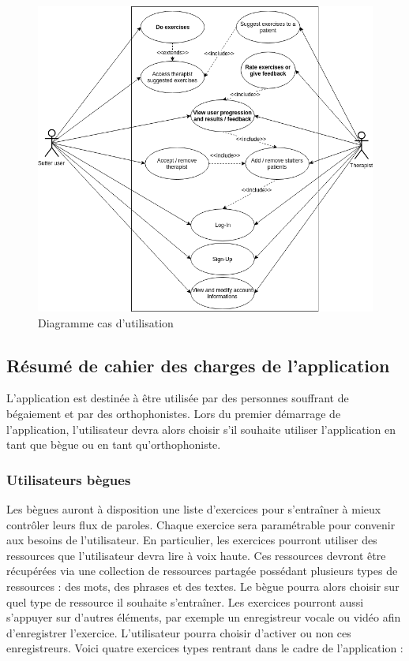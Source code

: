\begin{figure}[h]
  \includegraphics[width=.9\linewidth]{content/imgs/usecase.png}
  \caption{Diagramme cas d'utilisation}
  \label{fig:srs}
\end{figure}

\subsection{Résumé de cahier des charges de l'application}
\label{sec:resume_cdc}

L'application est destinée à être utilisée par des personnes souffrant de bégaiement et par des orthophonistes. Lors du premier démarrage de l'application, l'utilisateur devra alors choisir s'il souhaite utiliser l'application en tant que bègue ou en tant qu'orthophoniste.

\subsubsection{Utilisateurs bègues}

Les bègues auront à disposition une liste d'exercices pour s'entraîner à mieux contrôler leurs flux de paroles. Chaque exercice sera paramétrable pour convenir aux besoins de l'utilisateur. En particulier, les exercices pourront utiliser des ressources que l'utilisateur devra lire à voix haute. Ces ressources devront être récupérées via une collection de ressources partagée possédant plusieurs types de ressources : des mots, des phrases et des textes. Le bègue pourra alors choisir sur quel type de ressource il souhaite s'entraîner. Les exercices pourront aussi s'appuyer sur d'autres éléments, par exemple un enregistreur vocale ou vidéo afin d'enregistrer l'exercice. L'utilisateur pourra choisir d'activer ou non ces enregistreurs. Voici quatre exercices types rentrant dans le cadre de l'application :


